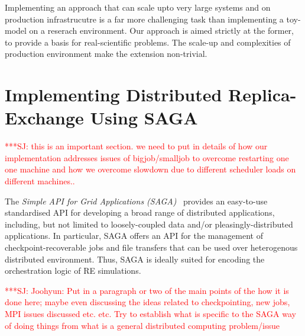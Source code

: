 \documentclass{rspublic}
\newcommand{\jhanote}[1]{ {\textcolor{red} { ***SJ: #1 }}}
\newcommand{\jhanote}[1]{}
\begin{document}

Implementing an approach that can scale upto very large systems and on
production infrastrucutre is a far more challenging task than
implementing a toy-model on a reserach environment. Our approach is
aimed strictly at the former, to provide a basis for real-scientific
problems. The scale-up and complexities of production environment make
the extension non-trivial.


\section{Implementing Distributed Replica-Exchange Using SAGA}

\jhanote{this is an important section. we need to put in details of
  how our implementation addresses issues of bigjob/smalljob to
  overcome restarting one one machine and how we overcome slowdown due
  to different scheduler loads on different machines..}

The \emph{Simple API for Grid Applications (SAGA)}~\citep{saga_gfd90}
provides an easy-to-use standardised API for developing a broad range
of distributed applications, including, but not limited to
loosely-coupled data and/or pleasingly-distributed applications.  
In particular, SAGA offers an API for the management of
checkpoint-recoverable jobs and file transfers that can be used over
heterogenous distributed environment. Thus, SAGA is ideally suited for
encoding the orchestration logic of RE simulations.

\jhanote{Joohyun: Put in a paragraph or two of the main points of the
  how it is done here; maybe even discussing the ideas related to
  checkpointing, new jobs, MPI issues discussed etc. etc. Try to
  establish what is specific to the SAGA way of doing things from what
  is a general distributed computing problem/issue}
          
\end{document}
